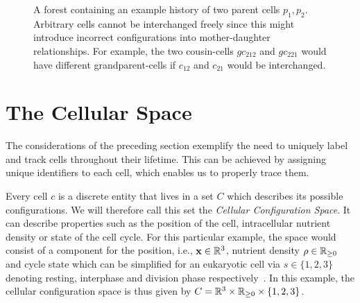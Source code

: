 \begin{figure}
    \centering
    \caption[Cellular history example tree]{
        A forest containing an example history of two parent cells $p_1,p_2$.
        Arbitrary cells cannot be interchanged freely since this might introduce incorrect
        configurations into mother-daughter relationships.
        For example, the two cousin-cells $gc_{212}$ and $gc_{221}$ would have different
        grandparent-cells if $c_{12}$ and $c_{21}$ would be interchanged.
    }
    \label{fig:theory-thought-experiment-3}
\end{figure}

\section{The Cellular Space}
\label{subsec:cellular-space}
The considerations of the preceding section exemplify the need to uniquely label and track cells
throughout their lifetime.
This can be achieved by assigning unique identifiers to each cell, which enables us to properly
trace them.

Every cell $c$ is a discrete entity that lives in a set $C$ which describes its possible
configurations.
We will therefore call this set the \textit{Cellular Configuration Space}.
It can describe properties such as the position of the cell, intracellular nutrient density or state
of the cell cycle.
For this particular example, the space would consist of a component for the position, i.e.,
$\mathbf{x}\in\mathbb{R}^3$, nutrient density $\rho\in\mathbb{R}_{\geq 0}$ and cycle state which can be simplified for
an eukaryotic cell via $s\in\{1,2,3\}$ denoting resting, interphase and division phase
respectively~\cite{Alberts2018}.
In this example, the cellular configuration space is thus given by
$C=\mathbb{R}^3\times\mathbb{R}_{\geq 0}\times\{1,2,3\}$.

